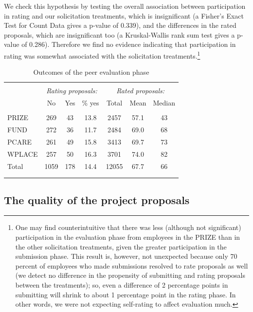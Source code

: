 \documentclass[11pt, titlepage]{article}
\begin{document}
We check this hypothesis by testing the overall association between
participation in rating and our solicitation treatments, which is
insignificant (a Fisher's Exact Test for Count Data gives a p-value of
0.339), and the differences in the rated proposals, which are
insignificant too (a Kruskal-Wallis rank sum test gives a p-value of
0.286). Therefore we find no evidence indicating that participation in
rating was somewhat associated with the solicitation
treatments.\footnote{One may find counterintuitive that there was less
  (although not significant) participation in the evaluation phase from
  employees in the PRIZE than in the other solicitation treatments,
  given the greater participation in the submission phase. This result
  is, however, not unexpected because only 70 percent of employees who
  made submissions resolved to rate proposals as well (we detect no
  difference in the propensity of submitting and rating proposals
  between the treatments); so, even a difference of 2 percentage points
  in submitting will shrink to about 1 percentage point in the rating
  phase. In other words, we were not expecting self-rating to affect
  evaluation much.}

\begin{table}
\centering
\caption{Outcomes of the peer evaluation phase}
\label{tab: ratings}
\begin{tabular}{@{}lcccccc}
  \\[-1.8ex]\hline \hline \\[-1.8ex]
 & \multicolumn{3}{c}{\emph{Rating proposals:}} &         \multicolumn{3}{c}{\emph{Rated proposals:}} \\
 \cmidrule(lr){2-4}\cmidrule(lr){5-7} & No & Yes & \% yes & Total & Mean & Median \\ 
  \hline \\[-1.86ex]
PRIZE & 269 & 43 & 13.8 & 2457 & 57.1 & 43 \\ 
  FUND & 272 & 36 & 11.7 & 2484 & 69.0 & 68 \\ 
  PCARE & 261 & 49 & 15.8 & 3413 & 69.7 & 73 \\ 
  WPLACE & 257 & 50 & 16.3 & 3701 & 74.0 & 82 \\ 
  [1.8ex] Total & 1059 & 178 & 14.4 & 12055 & 67.7 & 66 \\ 
   \\[-1.8ex]\hline \hline \\[-1.8ex]
\end{tabular}
\end{table}

\subsection{The quality of the project
proposals}\label{the-quality-of-the-project-proposals}
\end{document}
